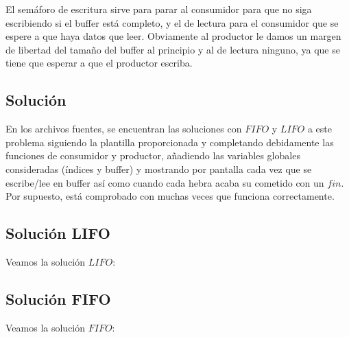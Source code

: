 \documentclass[11pt]{article}
\theoremstyle{ejercicio-style}
\begin{document}
El semáforo de escritura sirve para parar al consumidor para que no siga escribiendo si el buffer está completo, y el de lectura para el consumidor que se espere a que haya datos que leer. Obviamente al productor le damos un margen de libertad del tamaño del buffer al principio y al de lectura ninguno, ya que se tiene que esperar a que el productor escriba.

\subsection*{Solución}
\label{sec::solucion}
En los archivos fuentes, se encuentran las soluciones con $FIFO$ y $LIFO$ a este problema siguiendo la plantilla proporcionada y completando debidamente las funciones de consumidor y productor, añadiendo las variables globales consideradas (índices y buffer) y mostrando por pantalla cada vez que se escribe/lee en buffer así como cuando cada hebra acaba su cometido con un $fin$. Por supuesto, está comprobado con muchas veces que funciona correctamente.

\subsection*{Solución LIFO}
Veamos la solución $LIFO$:


\subsection*{Solución FIFO}
Veamos la solución $FIFO$:

\end{document}
